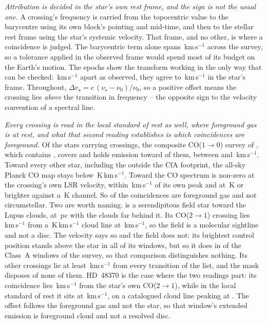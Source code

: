 \emph{Attribution is decided in the star's own rest frame, and the sign is
not the usual one.} A crossing's frequency is carried from the topocentric
value to the barycentre using its own block's pointing and mid-time, and then
to the stellar rest frame using the star's systemic velocity. That frame, and
no other, is where a coincidence is judged.
The barycentric term alone spans \FrBarySwing\,km\,s$^{-1}$ across the
survey, so a tolerance applied in the observed frame would spend most of its
budget on the Earth's motion. The \FrEpochNEpoch{} \FrEpochStar{} epochs show
the transform working in the only way that can be checked:
\FrEpochTopoKms\,km\,s$^{-1}$ apart as observed, they agree to
\FrEpochStelKms\,km\,s$^{-1}$ in the star's frame.
Throughout, $\Delta v_\star = c\,(\nu_\star-\nu_0)/\nu_0$, so a positive
offset means the crossing lies \emph{above} the transition in frequency --
the opposite sign to the velocity convention of a spectral line.

\emph{Every crossing is read in the local standard of rest as well, where
foreground gas is at rest, and what that second reading establishes is which
coincidences are foreground.} Of the \LsNLos{} stars carrying crossings, the composite
CO($1\to0$) survey of \citet{DameThaddeus2022}, which contains
\citet{Dame2001}, covers \LsNLosCov{} and holds emission toward \LsNLosDet{}
of them, between \LsCoVLo{} and \LsCoVHi\,km\,s$^{-1}$. Toward every other
star, including the \LsNLosOut{} outside the CfA footprint, the all-sky
Planck CO map \citep{PlanckCO2016} stays below
\LsPlanckMax\,K\,km\,s$^{-1}$. Toward
\LsCloudStars{} the CO spectrum is non-zero at the crossing's own LSR
velocity, within \LsCloudDvMax\,km\,s$^{-1}$ of its own peak and at
\LsCloudTMin\,K or brighter against a \LsCoRms\,K channel. So \LsNCloud{} of
the \MkNCoinc{} coincidences are foreground gas and not circumstellar.
Two are worth naming. \BkAlmaName{} is a serendipitous field star toward the
Lupus clouds, at \BkAlmaDistPc\,pc with the clouds far behind it. Its
CO($2\to1$) crossing lies \LsLupDv\,km\,s$^{-1}$ from a
\LsLupWco\,K\,km\,s$^{-1}$ cloud line at \LsLupVco\,km\,s$^{-1}$, so the
field is a molecular sightline and not a disc. The velocity says so and the
field
does not: its brightest control position stands above the star in all
\LsLupNRingLeadWord{} of its windows, but so it does in \LsRingLeadA{} of the
\NWinA{} Class~A windows of the survey, so that comparison
distinguishes nothing. Its other
\LsLupNFar{} crossings lie at least \LsLupFarMin\,km\,s$^{-1}$ from every
transition of the list, and the mask disposes of none of them. HD~48370 is
the case where the two readings part: its coincidence lies
\LsHdDvStar\,km\,s$^{-1}$ from the star's own CO($2\to1$), while in the local
standard of rest it sits at \LsHdVfeat\,km\,s$^{-1}$, on a catalogued cloud
line peaking at \LsHdVco. The offset follows the foreground gas and not the
star, so that window's extended emission is foreground cloud and not a
resolved disc.

